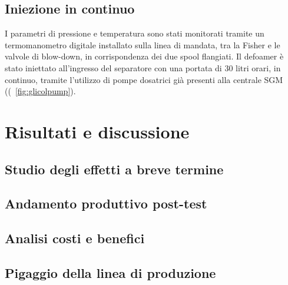 \subsection{Iniezione in continuo}

I parametri di pressione e temperatura sono stati monitorati tramite un termomanometro digitale installato sulla linea di mandata, tra la Fisher e le valvole di blow-down, in corrispondenza dei due spool flangiati. Il defoamer è stato iniettato all'ingresso del separatore con una portata di 30 litri orari, in continuo, tramite l'utilizzo di pompe dosatrici già presenti alla centrale SGM ((\figurename~\ref{fig:glicolpump}).

\section{Risultati e discussione}
\subsection{Studio degli effetti a breve termine}
\subsection{Andamento produttivo post-test}
\subsection{Analisi costi e benefici}
\subsection{Pigaggio della linea di produzione}